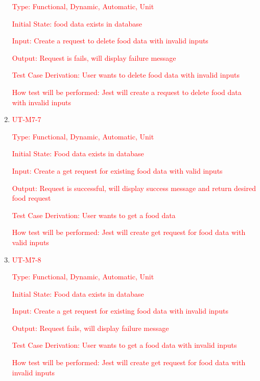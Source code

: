 \documentclass[12pt, titlepage]{article}
\begin{document}
\begin{enumerate}
	\textcolor{red}{Type: Functional, Dynamic, Automatic, Unit}

	\textcolor{red}{Initial State: food data exists in database}

	\textcolor{red}{Input: Create a request to delete food data with invalid inputs}

	\textcolor{red}{Output: Request is fails, will display failure message}

	\textcolor{red}{Test Case Derivation: User wants to delete food data with invalid inputs}

	\textcolor{red}{How test will be performed: Jest will create a request to delete food data with invalid inputs}

 \item{\textcolor{red}{UT-M7-7\\}}

	\textcolor{red}{Type: Functional, Dynamic, Automatic, Unit}

	\textcolor{red}{Initial State: Food data exists in database}

	\textcolor{red}{Input: Create a get request for existing food data with valid inputs}

	\textcolor{red}{Output: Request is successful, will display success message and return desired food request}

	\textcolor{red}{Test Case Derivation: User wants to get a food data}

	\textcolor{red}{How test will be performed: Jest will create get request for food data with valid inputs}

	\item{\textcolor{red}{UT-M7-8\\}}

	\textcolor{red}{Type: Functional, Dynamic, Automatic, Unit}

	\textcolor{red}{Initial State: Food data exists in database}

	\textcolor{red}{Input: Create a get request for existing food data with invalid inputs}

	\textcolor{red}{Output: Request fails, will display failure message}

	\textcolor{red}{Test Case Derivation: User wants to get a food data with invalid inputs}

	\textcolor{red}{How test will be performed: Jest will create get request for food data with invalid inputs}

\end{enumerate}
\end{document}
